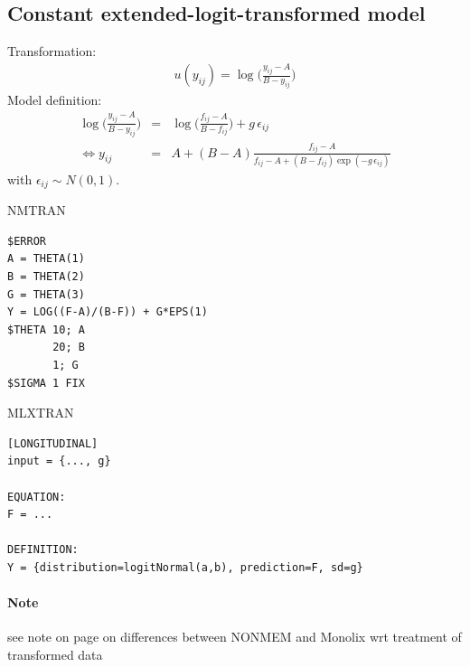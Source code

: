 \subsection{Constant extended-logit-transformed model}
\label{model12}

Transformation:
\begin{eqnarray}
u(y_{ij}) =  \log\Big(\frac{y_{ij} - A}{B-y_{ij}}\Big) \nonumber	
\end{eqnarray}
Model definition:
\begin{eqnarray}
\log\Big(\frac{y_{ij} - A}{B-y_{ij}}\Big) &=& \log\Big(\frac{f_{ij}-A}{B-f_{ij}}\Big) + g\,\epsilon_{ij} \nonumber\\
 \Longleftrightarrow y_{ij} &=& A + (B-A) \frac{f_{ij}-A}{f_{ij} - A + (B-f_{ij})\exp(-g\,\epsilon_{ij})} \nonumber
\end{eqnarray}
with $\epsilon_{ij} \sim N(0,1)$. 

\bigskip
\begin{lrbox}{\lstbox}\begin{minipage}{16cm}
NMTRAN
\begin{lstlisting}[frame=single,language=NM]
$ERROR
A = THETA(1)
B = THETA(2)
G = THETA(3)
Y = LOG((F-A)/(B-F)) + G*EPS(1)
$THETA 10; A
	   20; B
	   1; G
$SIGMA 1 FIX
\end{lstlisting}   
\end{minipage}\end{lrbox}
\usebox\lstbox

\begin{lrbox}{\lstbox}\begin{minipage}{16cm}
MLXTRAN
\begin{lstlisting}[frame=single,language=MLX]
[LONGITUDINAL]
input = {..., g}

EQUATION:
F = ...

DEFINITION:
Y = {distribution=logitNormal(a,b), prediction=F, sd=g}
\end{lstlisting}   
\end{minipage}\end{lrbox}
\usebox\lstbox

\paragraph{Note} see note on page \pageref{noteOnNM} on differences between NONMEM and Monolix
wrt treatment of transformed data


